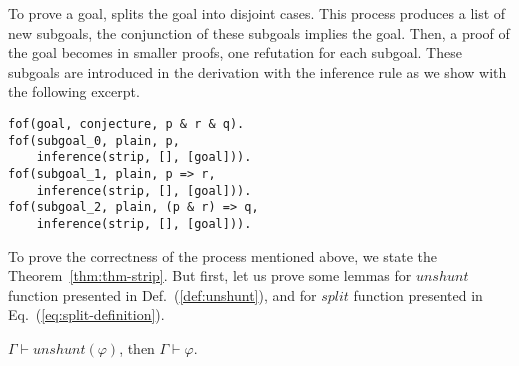 \documentclass[../main.tex]{subfiles}
\begin{document}
To prove a goal, \Metis splits the goal into
disjoint cases. This process produces a list of new subgoals, the
conjunction of these subgoals implies the goal. Then, a proof of the
goal becomes in smaller proofs, one refutation for each subgoal.
These subgoals are introduced in the \TSTP derivation with the \strip
inference rule as we show with the following excerpt.

\begin{verbatim}
fof(goal, conjecture, p & r & q).
fof(subgoal_0, plain, p,
    inference(strip, [], [goal])).
fof(subgoal_1, plain, p => r,
    inference(strip, [], [goal])).
fof(subgoal_2, plain, (p & r) => q,
    inference(strip, [], [goal])).
\end{verbatim}

To prove the correctness of the process mentioned above, we state
the Theorem~\ref{thm:thm-strip}. But first, let us prove some
lemmas for $unshunt$ function presented in Def.~(\ref{def:unshunt}),
and for $split$ function presented in Eq.~(\ref{eq:split-definition}).

\begin{lemma}
  \label{lem:unshunt}
  $Γ ⊢ unshunt(φ)$, then $Γ ⊢ φ$.
\end{lemma}
\end{document}
